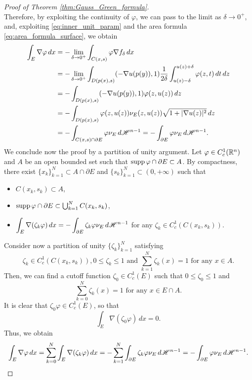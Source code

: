 \begin{proof}[Proof of Theorem \ref{thm:Gauss_Green_formula}]
\begin{equation*}
\end{equation*}
Therefore, by exploiting the continuity of $\varphi$, we can pass to the limit as $\delta \to 0^+$, and, exploiting \eqref{eq:inner_unit_param} and the area formula \eqref{eq:area_formula_surface}, we obtain
\begin{align*}
\int_{E} \nabla \varphi \, dx & = - \lim_{\delta \to 0^{+}} \int_{C(x, s)} \varphi \nabla f_{\delta} \, dx \\
& = - \lim_{\delta \to 0^{+}} \int_{D(p(x), s)} (- \nabla u(p(y)), 1) \frac{1}{2 \delta} \int_{u(z) - \delta}^{u(z) + \delta} \varphi(z, t) \, dt \, dz \\
& = - \int_{D(p(x), s)} (- \nabla u(p(y)), 1) \varphi(z, u(z)) \, d z \\
& = - \int_{D(p(x), s)} \varphi(z, u(z)) \nu_{E}(z, u(z)) \sqrt{1 + |\nabla u(z)|^2} \, dz \\
& = - \int_{C(x, s) \cap \partial E} \varphi \nu_{E} \, d \mathscr{H}^{n - 1} = - \int_{\partial E} \varphi \nu_{E} \, d \mathscr{H}^{n - 1}.
\end{align*}
We conclude now the proof by a partition of unity argument. Let $\varphi \in C^{1}_c(\mathbb{R}^{n})$ and $A$ be an open bounded set such that $\operatorname{supp} \varphi \cap \partial E \subset A$. By compactness, there exist $\{x_{k}\}_{k = 1}^{N} \subset A \cap \partial E$ and $\{s_{k}\}_{k = 1}^{N} \subset (0, + \infty)$ such that 
\begin{itemize}
\item $C(x_k, s_k) \subset A$,
\item $\operatorname{supp} \varphi \cap \partial E \subset \bigcup_{k = 1}^{N} C(x_k, s_k)$,
\item $\displaystyle \int_{E} \nabla (\zeta_{k} \varphi) \, dx = - \int_{\partial E} \zeta_{k} \varphi \nu_{E} \, d \mathscr{H}^{n - 1}$ for any $\zeta_{k} \in C^{1}_{c}(C(x_{k}, s_{k}))$.
\end{itemize}
Consider now a partition of unity $\{\zeta_k\}_{k = 1}^{N}$ satisfying 
\begin{equation*}
\zeta_{k} \in C^{1}_{c}(C(x_{k}, s_{k})), 0 \le \zeta_k \le 1 \text{ and } \sum_{k = 1}^{N} \zeta_{k}(x) = 1 \text{ for any } x \in A.
\end{equation*}
Then, we can find a cutoff function $\zeta_{0} \in C^{1}_{c}(E)$ such that $0 \le \zeta_{0} \le 1$ and $$\sum_{k = 0}^{N} \zeta_{k}(x) = 1 \text{ for any } x \in E \cap A.$$
It is clear that $\zeta_{0} \varphi \in C^{1}_{c}(E)$, so that
\begin{equation*}
\int_{E} \nabla(\zeta_{0} \varphi ) \, dx = 0.
\end{equation*}
Thus, we obtain
\begin{equation*}
\int_{E} \nabla \varphi \, dx = \sum_{k = 0}^{N} \int_{E} \nabla (\zeta_{k} \varphi) \, dx = - \sum_{k = 1}^{N} \int_{\partial E} \zeta_{k} \varphi \nu_{E} \, d \mathscr{H}^{n - 1} = - \int_{\partial E} \varphi \nu_{E} \, d \mathscr{H}^{n - 1}.
\end{equation*}
\end{proof}

